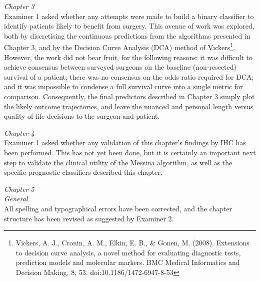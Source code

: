 \documentclass[a4paper,12pt,stdletter,sigleft]{newlfm}
\begin{document}
\begin{newlfm}
\emph{Chapter 3} \\
Examiner 1 asked whether any attempts were made to build a binary classifier to identify patients likely to benefit from surgery.  This avenue of work was explored, both by discretising the continuous predictions from the algorithms presented in Chapter 3, and by the Decision Curve Analysis (DCA) method of Vickers\footnote{Vickers, A. J., Cronin, A. M., Elkin, E. B., & Gonen, M. (2008). Extensions to decision curve analysis, a novel method for evaluating diagnostic tests, prediction models and molecular markers. BMC Medical Informatics and Decision Making, 8, 53. doi:10.1186/1472-6947-8-53}.  However, the work did not bear fruit, for the following reasons: it was difficult to achieve consensus between surveyed surgeons on the baseline (non-resected) survival of a patient; there was no consensus on the odds ratio required for DCA; and it was impossible to condense a full survival curve into a single metric for comparison.  Consequently, the final predictors described in Chapter 3 simply plot the likely outcome trajectories, and leave the nuanced and personal length versus quality of life decisions to the surgeon and patient.

\emph{Chapter 4} \\
Examiner 1 asked whether any validation of this chapter's findings by IHC has been performed.  This has not yet been done, but it is certainly an important next step to validate the clinical utility of the Messina algorithm, as well as the specific prognostic classifiers described this chapter.

\emph{Chapter 5} \\

\emph{General} \\

All spelling and typographical errors have been corrected, and the chapter structure has been revised as suggested by Examiner 2.


\end{newlfm}
\end{document}

